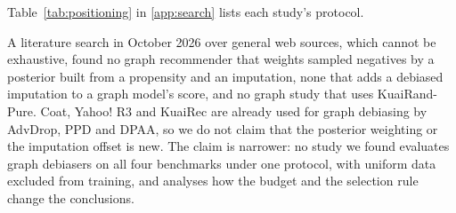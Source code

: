 Table~\ref{tab:positioning} in \ref{app:search} lists each study's protocol.


A literature search in October 2026 over general web sources, which cannot be exhaustive, found no graph
recommender that weights sampled negatives by a posterior built from a propensity and an imputation, none that adds
a debiased imputation to a graph model's score, and no graph study that uses KuaiRand-Pure. Coat, Yahoo! R3 and
KuaiRec are already used for graph debiasing by AdvDrop, PPD and DPAA, so we do not claim that the posterior
weighting or the imputation offset is new. The claim is narrower: no study we found evaluates graph debiasers on all
four benchmarks under one protocol, with uniform data excluded from training, and analyses how the budget and the
selection rule change the conclusions.
